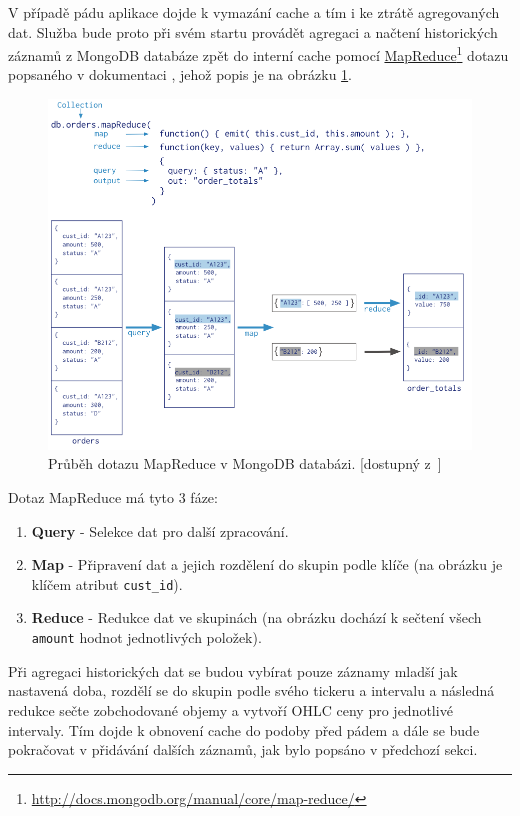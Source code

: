 \documentclass[thesis=M,czech]{FITthesis}[2012/06/26]
\newcommand\fnurl[2]{\href{#2}{#1}\footnote{\url{#2}}}
\begin{document}
	V případě pádu aplikace dojde k vymazání cache a tím i ke ztrátě agregovaných dat. Služba bude proto při svém startu provádět agregaci a načtení historických záznamů z MongoDB databáze zpět do interní cache pomocí \fnurl{MapReduce}{http://docs.mongodb.org/manual/core/map-reduce/} dotazu popsaného v dokumentaci \cite{MapReduce}, jehož popis je na obrázku \ref{fig:map_reduce}.
\begin{figure}[h]
	\centering
	\includegraphics[width=1\textwidth]{images/map-reduce}
 	\caption[Dotaz MapReduce nad MongoDB databází]{Průběh dotazu MapReduce v MongoDB databázi. [dostupný z~\cite{MapReduce}]}
 	\label{fig:map_reduce}
\end{figure}

	Dotaz MapReduce má tyto 3 fáze:
	
\begin{enumerate}
  \item \textbf{Query} - Selekce dat pro další zpracování.
  \item \textbf{Map} - Připravení dat a jejich rozdělení do skupin podle klíče (na obrázku je klíčem atribut \texttt{cust\_id}).
  \item \textbf{Reduce} - Redukce dat ve skupinách (na obrázku dochází k sečtení všech \texttt{amount} hodnot jednotlivých položek).
\end{enumerate}
	
	Při agregaci historických dat se budou vybírat pouze záznamy mladší jak nastavená doba, rozdělí se do skupin podle svého tickeru a intervalu a následná redukce sečte zobchodované objemy a vytvoří OHLC ceny pro jednotlivé intervaly. Tím dojde k obnovení cache do podoby před pádem a dále se bude pokračovat v přidávání dalších záznamů, jak bylo popsáno v předchozí sekci.
	
\end{document}

